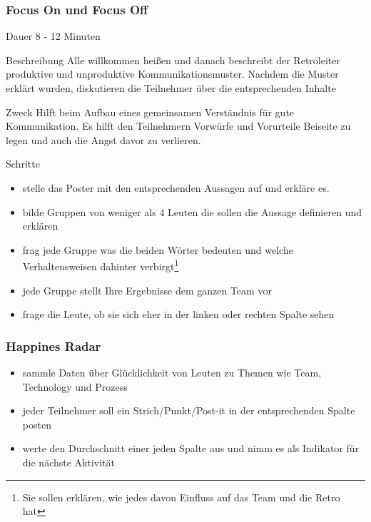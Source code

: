 \subsubsection{Focus On und Focus Off}
\begin{Beschreibungfett}[Beschreibung]
  \item [Dauer] 8 - 12 Minuten
  \item [Beschreibung] Alle willkommen heißen und danach beschreibt der Retroleiter
  produktive und unproduktive Kommunikationsmuster. Nachdem die Muster erklärt wurden,
  diskutieren die Teilnehmer über die entsprechenden Inhalte
\item [Zweck] Hilft beim Aufbau eines gemeinsamen Verständnis für gute Kommunikation. Es
  hilft den Teilnehmern Vorwürfe und Vorurteile Beiseite zu legen und auch die Angst davor zu
  verlieren.
  \item [Schritte]
    \begin{itemize}
      \item stelle das Poster mit den entsprechenden Aussagen auf und erkläre es.
      \item bilde Gruppen von weniger als 4 Leuten die sollen die Aussage definieren und erklären
      \item frag jede Gruppe was die beiden Wörter bedeuten und welche Verhaltensweisen dahinter
        verbirgt\footnote{Sie sollen erklären, wie jedes davon Einfluss auf das Team und die Retro
          hat}
      \item jede Gruppe stellt Ihre Ergebnisse dem ganzen Team vor
      \item frage die Leute, ob sie sich eher in der linken oder rechten Spalte sehen
    \end{itemize}
\end{Beschreibungfett}


\subsubsection{Happines Radar}
\begin{itemize}
  \item sammle Daten über Glücklichkeit von Leuten zu Themen wie Team, Technology und Prozess
  \item jeder Teilnehmer soll ein Strich/Punkt/Post-it in der entsprechenden Spalte posten
  \item werte den Durchschnitt einer jeden Spalte aus und nimm es als Indikator für die
    nächste Aktivität
\end{itemize}


